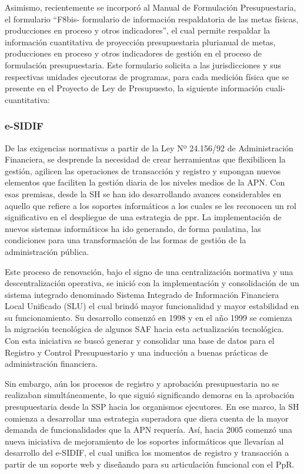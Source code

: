 Asimismo, recientemente se incorporó al Manual de Formulación Presupuestaria, el formulario “F8bis- formulario de información respaldatoria de las metas físicas, producciones en proceso y otros indicadores”, el cual permite respaldar la información cuantitativa de proyección presupuestaria plurianual de metas, producciones en proceso y otros indicadores de gestión en el proceso de formulación presupuestaria. Este formulario solicita a las jurisdicciones y sus respectivas unidades ejecutoras de programas, para cada medición física que se presente en el Proyecto de Ley de Presupuesto, la siguiente información cuali-cuantitativa: 

\subsubsection*{e-SIDIF}

De las exigencias normativas a partir de la Ley Nº 24.156/92 de Administración Financiera, se desprende la necesidad de crear herramientas que flexibilicen la gestión, agilicen las operaciones de transacción y registro y supongan nuevos elementos que faciliten la gestión diaria de los niveles medios de la APN. Con esas premisas, desde la SH se han ido desarrollando avances considerables en aquello que refiere a los soportes informáticos a los cuales se les reconocen un rol significativo en el despliegue de una estrategia de \ac{ppr}. La implementación de nuevos sistemas informáticos ha ido generando, de forma paulatina, las condiciones para una transformación de las formas de gestión de la administración pública. 

Este proceso de renovación, bajo el signo de una centralización normativa y una descentralización operativa, se inició con la implementación y consolidación de un sistema integrado denominado Sistema Integrado de Información Financiera Local Unificado (SLU) el cual brindó mayor funcionalidad y mayor estabilidad en su funcionamiento. Su desarrollo comenzó en 1998 y en el año 1999 se comienza la migración tecnológica de algunos SAF hacia esta actualización tecnológica. Con esta iniciativa se buscó generar y consolidar una base de datos para el Registro y Control Presupuestario y una inducción a buenas prácticas de administración financiera. 

Sin embargo, aún los procesos de registro y aprobación presupuestaria no se realizaban simultáneamente, lo que siguió significando demoras en la aprobación presupuestaria desde la SSP hacia los organismos ejecutores. En ese marco, la SH comienza a desarrollar una estrategia superadora que diera cuenta de la mayor demanda de funcionalidades que la APN requería. Así, hacia 2005 comenzó una nueva iniciativa de mejoramiento de los soportes informáticos que llevarían al desarrollo del e-SIDIF, el cual unifica los momentos de registro y transacción a partir de un soporte web y diseñando para su articulación funcional con el PpR.

